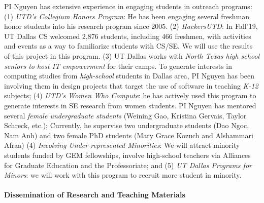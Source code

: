 PI Nguyen has extensive experience in engaging students in
outreach programs: (1) {\em UTD's Collegium Honors Program}: He
has been engaging several freshman honor students into his research
program since 2005. (2) {\em HackersUTD}: In Fall'19, UT Dallas CS
welcomed 2,876 students, including 466 freshmen, with activities and
events as a way to familiarize students with CS/SE. We will use the
results of this project in this program.
%
(3) UT Dallas works with {\em North Texas high school seniors to host
IT empowerment} for their camps. To generate interests in computing
studies from {\em high-school} students in Dallas area, PI Nguyen has
been involving them in design projects that target the use of software
in teaching {\em K-12} subjects; (4) {\em UTD's Women Who Compute}: he
has actively used this program to generate interests in SE research
from women students. PI Nguyen has mentored several {\em female
undergraduate students} (Weining Gao, Kristina Gervais, Taylor
Schreck, etc.); Currently, he supervise two undergraduate students
(Dao Ngoc, Nam Anh) and two female PhD students (Mary Grace Kozuch and
Alshammari Afraa) (4) {\em Involving Under-represented Minorities}: We
will attract minority students funded by GEM fellowships, involve
high-school teachers via Alliances for Graduate Education and the
Professoriate; and (5) {\em UT Dallas Programs for Minors}: we will
work with this program to recruit more student in minority.


\paragraph{Dissemination of Research and Teaching Materials}

